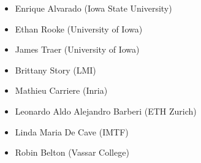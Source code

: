 \begin{itemize}
    \item Enrique Alvarado (Iowa State University)
    \item Ethan Rooke (University of Iowa)
    \item James Traer (University of Iowa)
    \item Brittany Story (LMI)
    \item Mathieu Carriere (Inria)
    \item Leonardo Aldo Alejandro Barberi (ETH Zurich)
    \item Linda Maria De Cave (IMTF)
    \item Robin Belton (Vassar College)
\end{itemize}